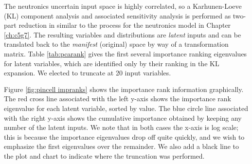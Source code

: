 The neutronics uncertain input space is highly correlated, so a Karhunen-Loeve (KL) component analysis and
associated sensitivity analysis is performed as
two-part reduction \cite{physor2016} in \raven{} similar to the process for the neutronics model
in Chapter \ref{ch:c5g7}.  The resulting variables and distributions are \emph{latent} inputs and can be
translated back to the \emph{manifest} (original) space by way of a transformation matrix.
Table \ref{tab:pcarank} gives the first several importance ranking eigenvalues for latent variables, which are
identified only by their ranking in the KL expansion.  We elected to truncate at 20 input variables.  

Figure \ref{fig:pincell impranks} shows the importance rank
information graphically.  The red cross line associated with the left y-axis shows the importance rank
eigenvalue for each latent variable, sorted by value.  The blue circle line associated with the right y-axis
shows the cumulative importance obtained by keeping any number of the latent inputs.  We note that in both
cases the x-axis is log scale; this is because the importance eigenvalues drop off quite quickly, and we wish
to emphasize the first eigenvalues over the remainder.  We also add a black line to the plot and chart
to indicate where the truncation was performed.

